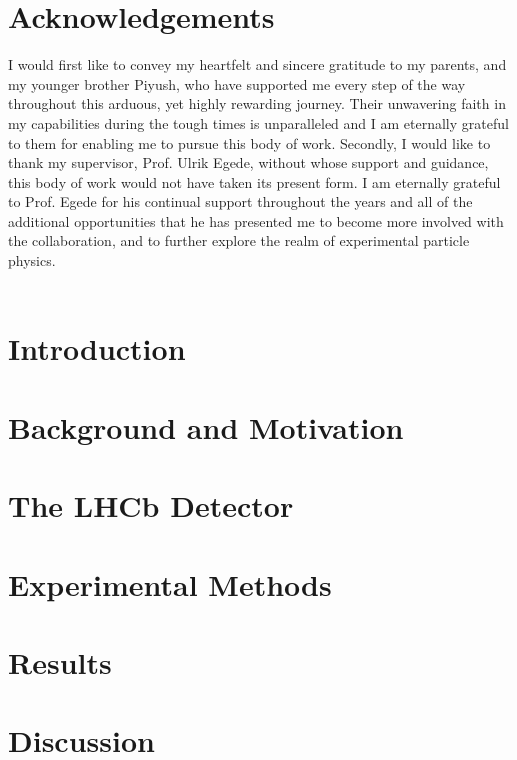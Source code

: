 \documentclass[11.5pt]{report}
\begin{document}
\chapter*{Acknowledgements}
I would first like to convey my heartfelt and sincere gratitude to my parents, and my younger brother Piyush, who have supported me every step of the way throughout this arduous, yet highly rewarding journey. Their unwavering faith in my capabilities during the tough times is unparalleled and I am eternally grateful to them for enabling me to pursue this body of work. 
Secondly, I would like to thank my supervisor, Prof. Ulrik Egede, without whose support and guidance, this body of work would not have taken its present form. I am eternally grateful to Prof. Egede for his continual support throughout the years and all of the additional opportunities that he has presented me to become more involved with the collaboration, and to further explore the realm of experimental particle physics. \\
\\

\newpage
\tableofcontents

\setlength{\parskip}{1em}
\renewcommand{\baselinestretch}{1.5}

\newpage
\chapter{Introduction}
\chapter{Background and Motivation}


\chapter{The LHCb Detector}

\chapter{Experimental Methods}

\chapter{Results}
\chapter{Discussion}
\
\end{document}
